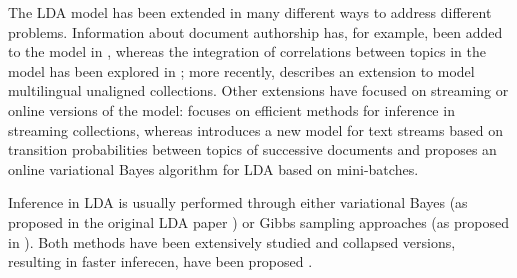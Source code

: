 
The LDA model \cite{blei_latent_2003} has been extended in many different ways to address different problems. Information about document authorship has, for example, been added to the model in \cite{Rosen_Zvi_2004}, whereas the integration of correlations between topics in the model has been explored in \cite{blei_correlated_2007}; more recently, \cite{Boyd_Graber_2009} describes an extension to model multilingual unaligned collections. Other extensions have focused on streaming or online versions of the model: \cite{Yao_2009} focuses on efficient methods for inference in streaming collections, whereas \cite{Wang_2012} introduces a new model for text streams based on transition probabilities between topics of successive documents and \cite{hoffman_online_2010} proposes an online variational Bayes algorithm for LDA based on mini-batches.

Inference in LDA is usually performed through either variational Bayes (as proposed in the original LDA paper \cite{blei_latent_2003}) or Gibbs sampling approaches (as proposed in \cite{griffiths04finding}). Both methods have been extensively studied and collapsed versions, resulting in faster inferecen, have been proposed \cite{teh_collapsed_2006,porteous_fast_2008}.  

